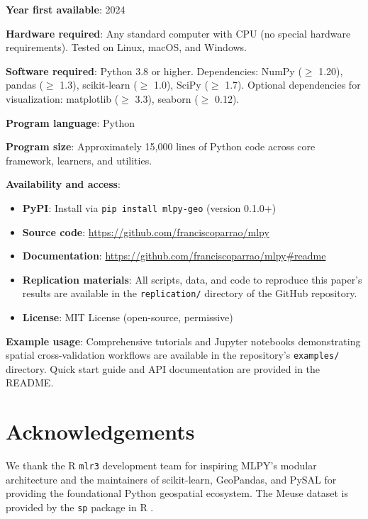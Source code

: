 \documentclass[a4paper,fleqn]{cas-sc}
\begin{document}
\textbf{Year first available}: 2024

\textbf{Hardware required}: Any standard computer with CPU (no special hardware requirements). Tested on Linux, macOS, and Windows.

\textbf{Software required}: Python 3.8 or higher. Dependencies: NumPy ($\geq$ 1.20), pandas ($\geq$ 1.3), scikit-learn ($\geq$ 1.0), SciPy ($\geq$ 1.7). Optional dependencies for visualization: matplotlib ($\geq$ 3.3), seaborn ($\geq$ 0.12).

\textbf{Program language}: Python

\textbf{Program size}: Approximately 15,000 lines of Python code across core framework, learners, and utilities.

\textbf{Availability and access}:
\begin{itemize}
\item \textbf{PyPI}: Install via \texttt{pip install mlpy-geo} (version 0.1.0+)
\item \textbf{Source code}: \url{https://github.com/franciscoparrao/mlpy}
\item \textbf{Documentation}: \url{https://github.com/franciscoparrao/mlpy#readme}
\item \textbf{Replication materials}: All scripts, data, and code to reproduce this paper's results are available in the \texttt{replication/} directory of the GitHub repository.
\item \textbf{License}: MIT License (open-source, permissive)
\end{itemize}

\textbf{Example usage}: Comprehensive tutorials and Jupyter notebooks demonstrating spatial cross-validation workflows are available in the repository's \texttt{examples/} directory. Quick start guide and API documentation are provided in the README.


\section*{Acknowledgements}

We thank the R \texttt{mlr3} development team for inspiring MLPY's modular architecture and the maintainers of scikit-learn, GeoPandas, and PySAL for providing the foundational Python geospatial ecosystem. The Meuse dataset is provided by the \texttt{sp} package in R \citep{pebesma2005classes}.




\end{document}
